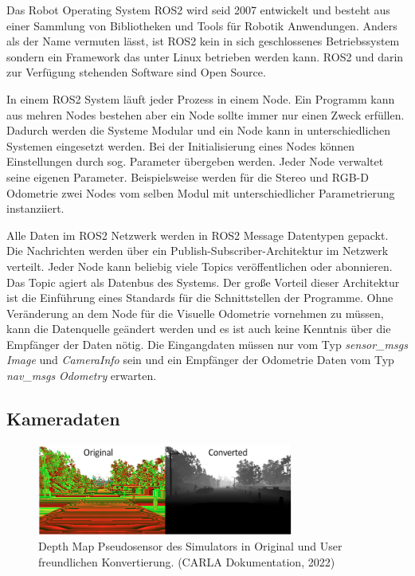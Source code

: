 Das Robot Operating System ROS2 wird seid 2007 entwickelt und besteht aus einer Sammlung von Bibliotheken und Tools für Robotik Anwendungen. Anders als der Name vermuten lässt, ist ROS2 kein in sich geschlossenes Betriebssystem sondern ein Framework das unter Linux betrieben werden kann. ROS2 und darin zur Verfügung stehenden Software sind Open Source.
\newline

In einem ROS2 System läuft jeder Prozess in einem Node. Ein Programm kann aus mehren Nodes bestehen aber ein Node sollte immer nur einen Zweck erfüllen. Dadurch werden die Systeme Modular und ein Node kann in unterschiedlichen Systemen eingesetzt werden. Bei der Initialisierung eines Nodes können Einstellungen durch sog. Parameter übergeben werden. Jeder Node verwaltet seine eigenen Parameter. Beispielsweise werden für die Stereo und RGB-D Odometrie zwei Nodes vom selben Modul mit unterschiedlicher Parametrierung instanziiert.
\newline

Alle Daten im ROS2 Netzwerk werden in ROS2 Message Datentypen gepackt. Die Nachrichten werden über ein Publish-Subscriber-Architektur im Netzwerk verteilt. Jeder Node kann beliebig viele Topics veröffentlichen oder abonnieren. Das Topic agiert als Datenbus des Systems.\newline 
Der gro{\ss}e Vorteil dieser Architektur ist die Einführung eines Standards für die Schnittstellen der Programme. Ohne Veränderung an dem Node für die Visuelle Odometrie vornehmen zu müssen, kann die Datenquelle geändert werden und es ist auch keine Kenntnis über die Empfänger der Daten nötig. Die Eingangdaten müssen nur vom Typ \textit{sensor\_msgs Image} und \textit{CameraInfo} sein und ein Empfänger der Odometrie Daten vom Typ \textit{nav\_msgs} \textit{Odometry} erwarten.

\subsection{Kameradaten}

\begin{figure}[!h]
  \begin{center}
    \includegraphics[width=0.75\textwidth]{pictures/depth_map_carla.png}
    \caption[CARLA Tiefenkarte]{Depth Map Pseudosensor des Simulators in Original und User freundlichen Konvertierung. (CARLA Dokumentation, 2022)}
  \end{center}
\end{figure}

